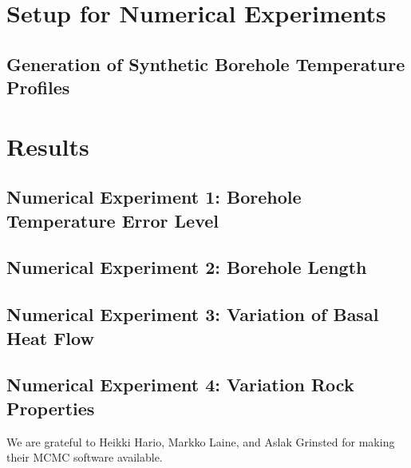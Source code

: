 \documentclass[cp]{copernicus}
\begin{document}
\section{Setup for Numerical Experiments} 
\subsection{Generation of Synthetic Borehole Temperature Profiles}

\section{Results}
\subsection{Numerical Experiment 1: Borehole Temperature Error Level}
\subsection{Numerical Experiment 2: Borehole Length}
\subsection{Numerical Experiment 3: Variation of Basal Heat Flow}
\subsection{Numerical Experiment 4: Variation Rock Properties}


\conclusions  %









\begin{acknowledgements}
We are grateful to Heikki Hario, Markko Laine, and Aslak Grinsted for making their MCMC software 
available. 
\end{acknowledgements}
\end{document}
